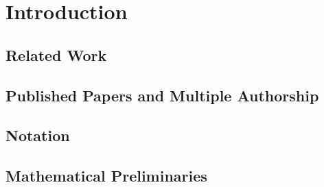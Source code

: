 
\chapter{Introduction}\label{chapter:introduction}



\section{Related Work}\label{sec:related-work}



\section{Published Papers and Multiple Authorship}



\section{Notation}\label{sec:notation}



\section{Mathematical Preliminaries}\label{sec:preliminaries}



